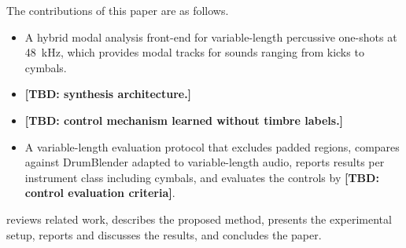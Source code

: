 The contributions of this paper are as follows.
\begin{itemize}
  \item A hybrid modal analysis front-end for variable-length percussive one-shots at 48~kHz, which provides modal tracks for sounds ranging from kicks to cymbals.
  \item \textbf{[TBD: synthesis architecture.]}
  \item \textbf{[TBD: control mechanism learned without timbre labels.]}
  \item A variable-length evaluation protocol that excludes padded regions, compares against DrumBlender adapted to variable-length audio, reports results per instrument class including cymbals, and evaluates the controls by \textbf{[TBD: control evaluation criteria]}.
\end{itemize}

 reviews related work,  describes the proposed method,  presents the experimental setup,  reports and discusses the results, and  concludes the paper.

